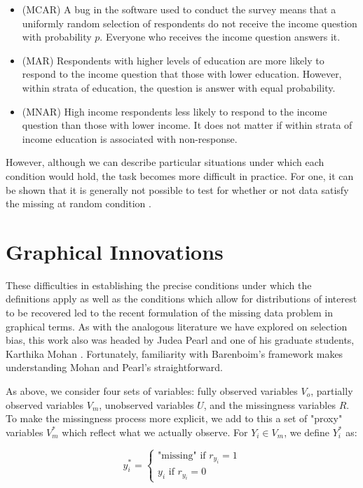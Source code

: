 \documentclass[12pt,twoside]{reedthesis}
\theoremstyle{definition}
\begin{document}
\begin{itemize}
\item (MCAR) A bug in the software used to conduct the survey means that a uniformly random selection of respondents do not receive the income question with probability $p$. Everyone who receives the income question answers it. 

\item (MAR) Respondents with higher levels of education are more likely to respond to the income question that those with lower education. However, within strata of education, the question is answer with equal probability.

\item (MNAR) High income respondents less likely to respond to the income question than those with lower income. It does not matter if within strata of income education is associated with non-response.  
\end{itemize}

However, although we can describe particular situations under which each condition would hold, the task becomes more difficult in practice. For one, it can be shown that it is generally not possible to test for whether or not data satisfy the missing at random condition \citep{Schafer_2002}. 
\section{Graphical Innovations}

These difficulties in establishing the precise conditions under which the definitions apply as well as the conditions which allow for distributions of interest to be recovered led to the recent formulation of the missing data problem in graphical terms. As with the analogous literature we have explored on selection bias, this work also was headed by Judea Pearl and one of his graduate students, Karthika Mohan \citep{Mohan_2013} \citep{Mohan_2019}. Fortunately, familiarity with Barenboim's framework makes understanding Mohan and Pearl's straightforward. 

As above, we consider four sets of variables: fully observed variables $V_o$, partially observed variables $V_m$, unobserved variables $U$, and the missingness variables $R$. To make the missingness process more explicit, we add to this a set of "proxy" variables $V^*_m$ which reflect what we actually observe. For $Y_i \in V_m$, we define $Y^*_i$ as:

$$y^*_i = \begin{cases} \text{"missing" if } r_{y_i} = 1 \\ y_i \text{ if } r_{y_i} = 0  \end{cases}$$
\end{document}
